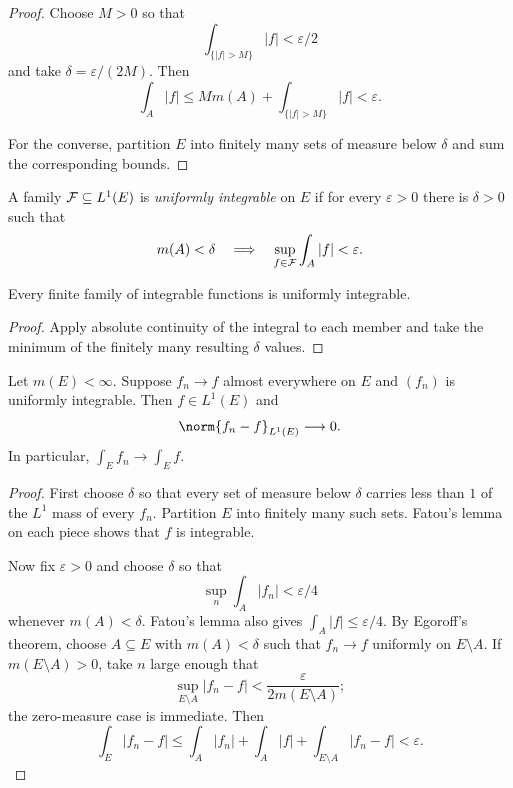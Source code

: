\begin{proof}
Choose $M>0$ so that
\[
\int_{\{|f|>M\}}|f|<\varepsilon/2
\]
and take $\delta=\varepsilon/(2M)$. Then
\[
\int_A|f|
 \leq M m(A)+\int_{\{|f|>M\}}|f|<\varepsilon.
\]

For the converse, partition $E$ into finitely many sets of measure below $\delta$ and sum the corresponding bounds.
\end{proof}

\begin{de}
A family $\mathcal{F}\subseteq L^1(E)$ is \emph{uniformly integrable} on $E$ if for every $\varepsilon>0$ there is $\delta>0$ such that
\[
m(A)<\delta
\quad\Longrightarrow\quad
\sup_{f\in\mathcal{F}}\int_A|f|<\varepsilon.
\]
\end{de}

\begin{prop}
Every finite family of integrable functions is uniformly integrable.
\end{prop}

\begin{proof}
Apply absolute continuity of the integral to each member and take the minimum of the finitely many resulting $\delta$ values.
\end{proof}

\begin{thm}
Let $m(E)<\infty$. Suppose $f_n\to f$ almost everywhere on $E$ and $(f_n)$ is uniformly integrable. Then $f\in L^1(E)$ and
\[
\norm{f_n-f}_{L^1(E)}\longrightarrow0.
\]
In particular, $\int_Ef_n\to\int_Ef$.
\end{thm}

\begin{proof}
First choose $\delta$ so that every set of measure below $\delta$ carries less than $1$ of the $L^1$ mass of every $f_n$. Partition $E$ into finitely many such sets. Fatou's lemma on each piece shows that $f$ is integrable.

Now fix $\varepsilon>0$ and choose $\delta$ so that
\[
\sup_n\int_A|f_n|<\varepsilon/4
\]
whenever $m(A)<\delta$. Fatou's lemma also gives $\int_A|f|\leq\varepsilon/4$. By Egoroff's theorem, choose $A\subseteq E$ with $m(A)<\delta$ such that $f_n\to f$ uniformly on $E\setminus A$. If $m(E\setminus A)>0$, take $n$ large enough that
\[
\sup_{E\setminus A}|f_n-f|<\frac{\varepsilon}{2m(E\setminus A)};
\]
the zero-measure case is immediate. Then
\[
\int_E|f_n-f|
 \leq\int_A|f_n|+\int_A|f|
    +\int_{E\setminus A}|f_n-f|<\varepsilon.
\]
\end{proof}

